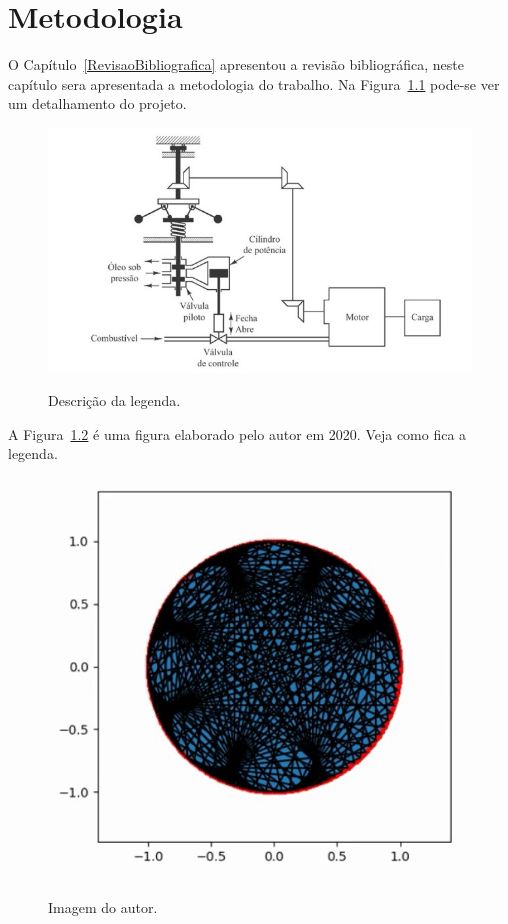 \chapter{Metodologia} \label{metodologia}

O Capítulo~\ref{RevisaoBibliografica} apresentou a revisão bibliográfica, neste capítulo sera apresentada a metodologia do trabalho. Na Figura~\ref{fig:quadro} pode-se ver um detalhamento do projeto.

\begin{figure}[ht] %
    \begin{center}
    \caption{Descrição da legenda.} %
    \label{fig:quadro}
    \includegraphics[width=\linewidth]{Figuras/imagem1.JPG} \\
    \end{center}
    \fontsize{10}{12}
    
\end{figure}

A Figura~\ref{fig:icone} é uma figura elaborado pelo autor em 2020. Veja como fica a legenda.

\begin{figure}[H] %
    \begin{center}
    \caption{Imagem do autor.} %
    \label{fig:icone}
    \includegraphics[width=0.5\linewidth]{Figuras/imagem2.jpg} \\
    \end{center}
    \fontsize{10}{12}\selectfont{Fonte: Elaborado pelo autor, \imprimirano. }
    
\end{figure}


